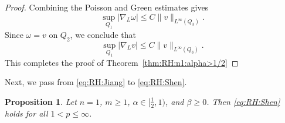 \documentclass[12pt]{amsart}
\newtheorem{proposition}[theorem]{Proposition}
\begin{document}
\begin{proof}
Combining the Poisson and Green estimates gives
\begin{equation*}
\sup_{Q_1}|\nabla_L\omega| \le C\|v\|_{L^\infty(Q_3)}.
\end{equation*}
Since $\omega=v$ on $Q_2$, we conclude that
\begin{equation*}
\sup_{Q_1}|\nabla_Lv| \le C\|v\|_{L^\infty(Q_3)}.
\end{equation*}
This completes the proof of Theorem~\ref{thm:RH:n1:alpha>1/2}


\end{proof}












Next, we pass from \eqref{eq:RH:Jiang} to \eqref{eq:RH:Shen}.

\begin{proposition}\label{prop_u_RH_to_Shen_RH_large_alpha}
Let $n=1$, $m\ge1$, $\alpha \in [\frac{1}{2},1)$, and $\beta \ge0$. Then \eqref{eq:RH:Shen} holds for all $1<p\le \infty$.
\end{proposition}
\end{document}
